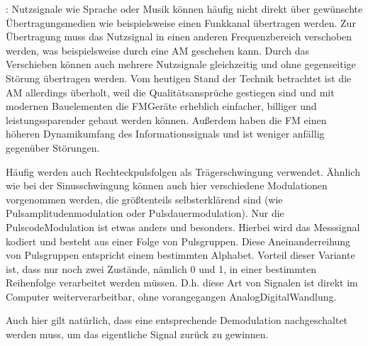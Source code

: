 \documentclass[letterpaper,10pt,english]{jupyterBook}
\begin{document}
\sphinxAtStartPar
{}: Nutzsignale wie Sprache oder Musik können häufig nicht direkt über gewünschte Übertragungsmedien wie beispielsweise einen Funkkanal übertragen werden. Zur Übertragung muss das Nutzsignal in einen anderen Frequenzbereich verschoben werden, was beispielsweise durch eine AM geschehen kann. Durch das Verschieben können auch mehrere Nutzsignale gleichzeitig und ohne gegenseitige Störung übertragen werden.
Vom heutigen Stand der Technik betrachtet ist die AM allerdings überholt, weil die Qualitätsansprüche gestiegen sind und mit modernen Bauelementen die FM\sphinxhyphen{}Geräte erheblich einfacher, billiger und leistungssparender gebaut werden können. Außerdem haben die FM einen höheren Dynamikumfang des Informationssignals und ist weniger anfällig gegenüber Störungen.

\sphinxAtStartPar
{}

\sphinxAtStartPar
Häufig werden auch Rechteckpulsfolgen als Trägerschwingung verwendet. Ähnlich wie bei der Sinusschwingung können auch hier verschiedene Modulationen vorgenommen werden, die größtenteils selbsterklärend sind (wie Pulsamplitudenmodulation oder Pulsdauermodulation). Nur die Pulscode\sphinxhyphen{}Modulation ist etwas anders und besonders. Hierbei wird das Messsignal kodiert und besteht aus einer Folge von Pulsgruppen. Diese Aneinanderreihung von Pulsgruppen entspricht einem bestimmten Alphabet. Vorteil dieser Variante ist, dass nur noch zwei Zustände, nämlich 0 und 1, in einer bestimmten Reihenfolge verarbeitet werden müssen. D.h. diese Art von Signalen ist direkt im Computer weiterverarbeitbar, ohne vorangegangen Analog\sphinxhyphen{}Digital\sphinxhyphen{}Wandlung.

\sphinxAtStartPar
Auch hier gilt natürlich, dass eine entsprechende Demodulation nachgeschaltet werden muss, um das eigentliche Signal zurück zu gewinnen.

\sphinxAtStartPar
{}
\end{document}
